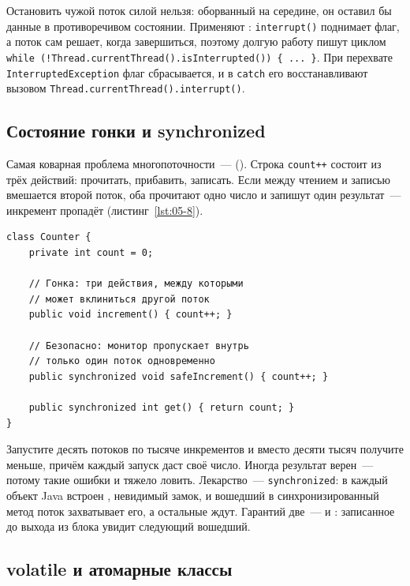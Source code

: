 Остановить чужой поток силой нельзя: оборванный на середине, он оставил бы данные
в противоречивом состоянии. Применяют : \texttt{interrupt()}
поднимает флаг, а поток сам решает, когда завершиться, поэтому долгую работу
пишут циклом \texttt{while (!Thread.currentThread().isInterrupted()) \{ ... \}}.
При перехвате \texttt{InterruptedException} флаг сбрасывается, и в \texttt{catch}
его восстанавливают вызовом \texttt{Thread.currentThread().interrupt()}.

\subsection{Состояние гонки и synchronized}

Самая коварная проблема многопоточности~--- 
(). Строка \texttt{count++} состоит из трёх действий:
прочитать, прибавить, записать. Если между чтением и записью вмешается второй
поток, оба прочитают одно число и запишут один результат~--- инкремент пропадёт
(листинг~\ref{lst:05-8}).

\begin{listing}[H]
\begin{verbatim}
class Counter {
    private int count = 0;

    // Гонка: три действия, между которыми
    // может вклиниться другой поток
    public void increment() { count++; }

    // Безопасно: монитор пропускает внутрь
    // только один поток одновременно
    public synchronized void safeIncrement() { count++; }

    public synchronized int get() { return count; }
}
\end{verbatim}
\caption{Небезопасный и безопасный счётчик}
\label{lst:05-8}
\end{listing}

Запустите десять потоков по тысяче инкрементов и вместо десяти тысяч получите
меньше, причём каждый запуск даст своё число. Иногда результат верен~--- потому
такие ошибки и тяжело ловить. Лекарство~--- \texttt{synchronized}: в каждый
объект Java встроен , невидимый замок, и вошедший в
синхронизированный метод поток захватывает его, а остальные ждут. Гарантий
две~---  и : записанное до
выхода из блока увидит следующий вошедший.

\subsection{volatile и атомарные классы}

